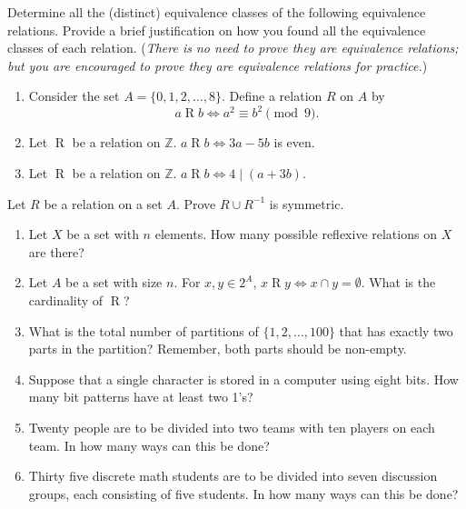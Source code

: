 \documentclass{article}
\theoremstyle{definition}
\begin{document}
\begin{question}{6}
    Determine all the (distinct) equivalence classes of the following equivalence relations. Provide a brief justification on how you found all the equivalence classes of each relation. (\textit{There is no need to prove they are equivalence relations; but you are encouraged to prove they are equivalence relations for practice.})
	\begin{enumerate}
	\item Consider the set $A = \{0, 1, 2, \dots, 8 \}$. Define a relation $R$ on $A$ by
	\[
	a\mathrel{R}b \iff a^2 \equiv b^2 \pmod{9}.
	\]
	\item Let $\mathrel{R}$ be a relation on $\mathbb{Z}$. $a\mathrel{R}b \iff 3a-5b$ is even.
	\item Let $\mathrel{R}$ be a relation on $\mathbb{Z}$. $a\mathrel{R}b \iff 4 \mid (a+3b)$.
	\end{enumerate}
\end{question}
\begin{solution}
\end{solution}

\begin{question}{4}
    Let $R$ be a relation on a set $A$. Prove $R\cup R^{-1}$ is symmetric.
\end{question}
\begin{solution}
\end{solution}

\begin{question}{18}
    \begin{enumerate}
    	\item Let $X$ be a set with $n$ elements. How many possible reflexive relations on $X$ are there?
	\item Let $A$ be a set with size $n$. For $x, y \in 2^{A}$, $x\mathrel{R}y \iff x \cap y = \emptyset$. What is the cardinality of $\mathrel{R}$?
   	\item What is the total number of partitions of $\{1, 2, \dots, 100 \}$ that has exactly two parts in the partition? 
	Remember, both parts should be non-empty.
        \item Suppose that a single character is stored in a computer using eight bits. 
        How many bit patterns have at least two 1's?
        	\item Twenty people are to be divided into two teams with ten players on each team.  
	In how many ways can this be done?
        \item Thirty five discrete math students are to be divided into seven discussion groups, each consisting of five students.  
        In how many ways can this be done?
   	\end{enumerate}
\end{question}
\begin{solution}
\end{solution}
\end{document}
